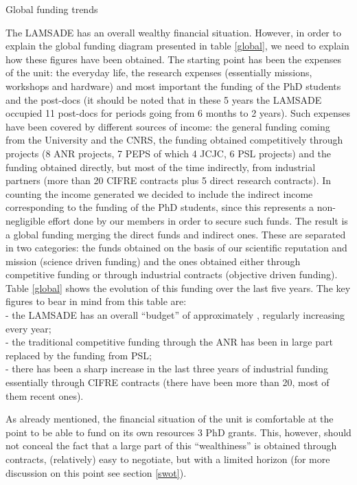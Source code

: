 \begin{table}
  \centering
  \caption{Global funding trends}\label{global}
\end{table}

The LAMSADE has an overall wealthy financial situation. However, in order to explain the global funding diagram presented in table \ref{global}, we need to explain how these figures have been obtained. The starting point has been the expenses of the unit: the everyday life, the research expenses (essentially missions, workshops and hardware) and most important the funding of the PhD students and the post-docs (it should be noted that in these 5 years the LAMSADE occupied 11 post-docs for periods going from 6 months to 2 years). Such expenses have been covered by different sources of income: the general funding coming from the University and the CNRS, the funding obtained competitively through projects (8 ANR projects, 7 PEPS of which 4 JCJC, 6 PSL projects) and the funding obtained directly, but most of the time indirectly, from industrial partners (more than 20 CIFRE contracts plus 5 direct research contracts). In counting the income generated we decided to include the indirect income corresponding to the funding of the PhD students, since this represents a non-negligible effort done by our members in order to secure such funds. The result is a global funding merging the direct funds and indirect ones. These are separated in two categories: the funds obtained on the basis of our scientific reputation and mission (science driven funding) and the ones obtained either through competitive funding or through industrial contracts (objective driven funding). Table \ref{global} shows the evolution of this funding over the last five years. The key figures to bear in mind from this table are: \\
 - the LAMSADE has an overall ``budget'' of approximately , regularly increasing every year; \\
 - the traditional competitive funding through the ANR has been in large part replaced by the funding from PSL; \\
 - there has been a sharp increase in the last three years of industrial funding essentially through CIFRE contracts (there have been more than 20, most of them recent ones).

As already mentioned, the financial situation of the unit is comfortable at the point to be able to fund on its own resources 3 PhD grants. This, however, should not conceal the fact that a large part of this ``wealthiness'' is obtained through contracts, (relatively) easy to negotiate, but with a limited horizon (for more discussion on this point see section \ref{swot}).

